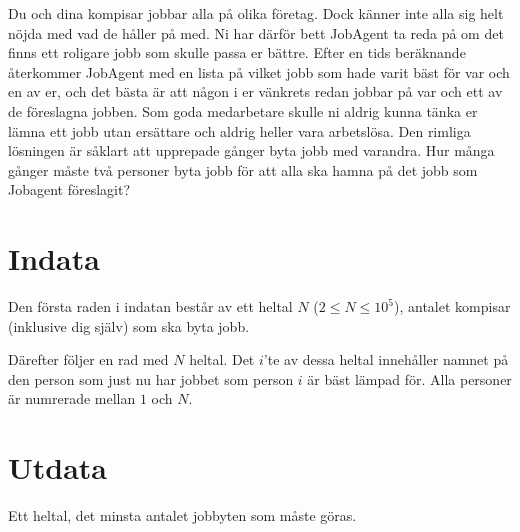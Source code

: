Du och dina kompisar jobbar alla på olika företag. 
Dock känner inte alla sig helt nöjda med vad de håller på med. 
Ni har därför bett JobAgent ta reda på om det finns ett roligare jobb som skulle passa er bättre.
Efter en tids beräknande återkommer JobAgent med en lista på vilket jobb som hade varit bäst för var och en av er, och det bästa är att någon i er vänkrets redan jobbar på var och ett av de föreslagna jobben. 
Som goda medarbetare skulle ni aldrig kunna tänka er lämna ett jobb utan ersättare och aldrig heller vara arbetslösa.
Den rimliga lösningen är såklart att upprepade gånger byta jobb med varandra.
Hur många gånger måste två personer byta jobb för att alla ska hamna på det jobb som Jobagent föreslagit?

\section*{Indata}
Den första raden i indatan består av ett heltal $N$ ($2 \le N \le 10^5$), antalet kompisar (inklusive dig själv) som ska byta jobb.

Därefter följer en rad med $N$ heltal.
Det $i$'te av dessa heltal innehåller namnet på den person som just nu har jobbet som person $i$ är bäst lämpad för.
Alla personer är numrerade mellan $1$ och $N$.

\section*{Utdata}
Ett heltal, det minsta antalet jobbyten som måste göras. 
